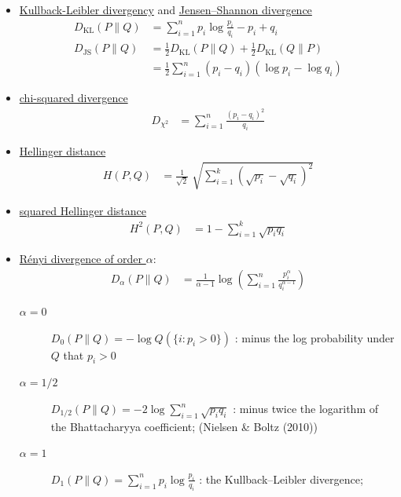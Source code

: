 \begin{itemize}
  \item  \href{https://en.wikipedia.org/wiki/Kullback%E2%80%93Leibler_divergence}{Kullback-Leibler divergency} and  \href{https://en.wikipedia.org/wiki/Jensen%E2%80%93Shannon_divergence}{Jensen–Shannon divergence}
\begin{align}
    D_\mathrm{KL}(P\|Q)&=\sum_{i=1}^np_i\log {\frac{p_i}{q_i}}-p_i+q_i \\
    D_\mathrm{JS}(P\|Q)&=\frac12 D_\mathrm{KL}(P\|Q)+\frac12 D_\mathrm{KL}(Q\|P) \nonumber \\
                       &=\frac12 \sum_{i=1}^n \left(p_i-q_i\right)\left(\log p_i - \log q_i\right)
\end{align}
  \item  \href{https://en.wikipedia.org/wiki/Chi-squared_divergence}{chi-squared divergence}
\begin{align}
    D_{\chi^2}&= \sum_{i=1}^n\frac{\left(p_i-q_i\right)^2}{q_i}
\end{align}
  \item \href{https://en.wikipedia.org/wiki/Hellinger_distance}{Hellinger distance}
\begin{align}
    H(P,Q)&={\frac {1}{\sqrt {2}}}\;{\sqrt {\sum _{i=1}^{k}({\sqrt {p_{i}}}-{\sqrt {q_{i}}})^{2}}}
\end{align}
  \item \href{https://en.wikipedia.org/wiki/Hellinger_distance}{squared Hellinger distance}
\begin{align}
    H^{2}(P,Q)&=1-\sum_{i=1}^{k}{\sqrt {p_{i}q_{i}}}
\end{align}
  \item  \href{https://en.wikipedia.org/wiki/R%C3%A9nyi_entropy#R%C3%A9nyi_divergence}{Rényi divergence of order $\alpha$}:
\begin{align}
    D_{\alpha }(P\|Q)&={\frac {1}{\alpha -1}}\log \left(\sum _{i=1}^{n}{\frac {p_{i}^{\alpha }}{q_{i}^{\alpha -1}}}\right)
\end{align}
    \begin{description}
        \item[$\alpha=0$] $D_{0}(P\|Q)=-\log Q(\{i:p_{i}>0\})$ : minus the log probability under $Q$ that $p_i > 0$
        \item[$\alpha=1/2$] $D_{1/2}(P\|Q)=-2\log \sum_{i=1}^n\sqrt{p_iq_i}$ : minus twice the logarithm of the Bhattacharyya coefficient; (Nielsen \& Boltz (2010))
        \item[$\alpha=1$] $D_{1}(P\|Q)=\sum_{i=1}^np_i\log {\frac{p_i}{q_i}}$ : the Kullback–Leibler divergence;

\end{description}
\end{itemize}

